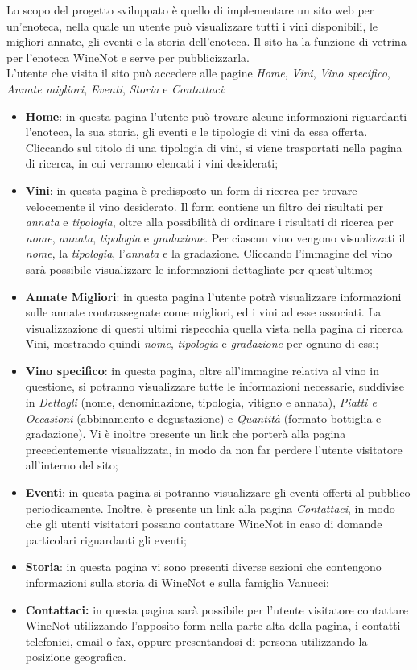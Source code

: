 Lo scopo del progetto sviluppato è quello di implementare un sito web per un'enoteca, nella quale un utente può visualizzare tutti i vini disponibili, le migliori annate, gli eventi e la storia dell'enoteca. 
Il sito ha la funzione di vetrina per l'enoteca WineNot e serve per pubblicizzarla. \\
L'utente che visita il sito può accedere alle pagine \textit{Home}, \textit{Vini}, \textit{Vino specifico}, \textit{Annate migliori}, \textit{Eventi}, \textit{Storia} e \textit{Contattaci}:
\begin{itemize}
	\item \textbf{Home}: in questa pagina l'utente può trovare alcune informazioni riguardanti l'enoteca, la sua storia, gli eventi e le tipologie di vini da essa offerta. Cliccando sul titolo di una tipologia di vini, si viene trasportati nella pagina di ricerca, in cui verranno elencati i vini desiderati; 
	\item \textbf{Vini}: in questa pagina è predisposto un form di ricerca per trovare velocemente il vino desiderato. Il form contiene un filtro dei risultati per \textit{annata} e \textit{tipologia}, oltre alla possibilità di ordinare i risultati di ricerca per \textit{nome}, \textit{annata}, \textit{tipologia} e \textit{gradazione}. Per ciascun vino vengono visualizzati il \textit{nome}, la \textit{tipologia}, l'\textit{annata} e la gradazione. Cliccando l'immagine del vino sarà possibile visualizzare le informazioni dettagliate per quest'ultimo;
	\item \textbf{Annate Migliori}: in questa pagina l'utente potrà visualizzare informazioni sulle annate contrassegnate come migliori, ed i vini ad esse associati. La visualizzazione di questi ultimi rispecchia quella vista nella pagina di ricerca Vini, mostrando quindi \textit{nome}, \textit{tipologia} e \textit{gradazione} per ognuno di essi;
	\item \textbf{Vino specifico}: in questa pagina, oltre all'immagine relativa al vino in questione, si potranno visualizzare tutte le informazioni necessarie, suddivise in \textit{Dettagli} (nome, denominazione, tipologia, vitigno e annata), \textit{Piatti e Occasioni} (abbinamento e degustazione) e \textit{Quantità} (formato bottiglia e gradazione). Vi è inoltre presente un link che porterà alla pagina precedentemente visualizzata, in modo da non far perdere l'utente visitatore all'interno del sito;
	\item \textbf{Eventi}: in questa pagina si potranno visualizzare gli eventi offerti al pubblico periodicamente. Inoltre, è presente un link alla pagina \textit{Contattaci}, in modo che gli utenti visitatori possano contattare WineNot in caso di domande particolari riguardanti gli eventi;
	\item \textbf{Storia}: in questa pagina vi sono presenti diverse sezioni che contengono informazioni sulla storia di WineNot e sulla famiglia Vanucci;
	\item \textbf{Contattaci:} in questa pagina sarà possibile per l'utente visitatore contattare WineNot utilizzando l'apposito form nella parte alta della pagina, i contatti telefonici, email o fax, oppure presentandosi di persona utilizzando la posizione geografica.
\end{itemize}

